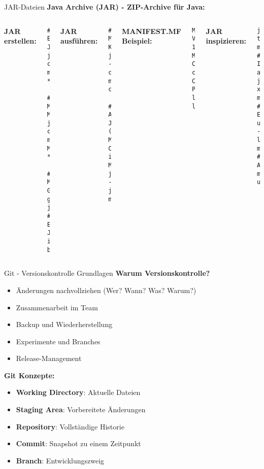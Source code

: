 \begin{frame}[fragile]{JAR-Dateien}
  \textbf{Java Archive (JAR) - ZIP-Archive für Java:}

  \begin{columns}[T]
    \textbf{JAR erstellen:}
    \begin{lstlisting}[style=java, basicstyle=\tiny\ttfamily, language={}]
# Einfache JAR
jar cf myapp.jar *.class

# Mit Manifest
jar cfm myapp.jar MANIFEST.MF *.class

# Mit Gradle
gradle jar  # Erstellt JAR in build/libs/
    \end{lstlisting}

    \textbf{JAR ausführen:}
    \begin{lstlisting}[style=java, basicstyle=\tiny\ttfamily, language={}]
# Mit Klassenname
java -cp myapp.jar com.example.Main

# Ausführbare JAR (mit Main-Class im Manifest)
java -jar myapp.jar
    \end{lstlisting}

    \textbf{MANIFEST.MF Beispiel:}
    \begin{lstlisting}[style=java, basicstyle=\tiny\ttfamily, language={}]
Manifest-Version: 1.0
Main-Class: com.example.Main
Class-Path: lib/dependency1.jar lib/dependency2.jar
    \end{lstlisting}

    \textbf{JAR inspizieren:}
    \begin{lstlisting}[style=java, basicstyle=\tiny\ttfamily, language={}]
jar tf myapp.jar        # Inhalt auflisten
jar xf myapp.jar        # Extrahieren
unzip -l myapp.jar      # Alternative mit unzip
    \end{lstlisting}
  \end{columns}
\end{frame}

\begin{frame}{Git - Versionskontrolle Grundlagen}
  \textbf{Warum Versionskontrolle?}
  \begin{itemize}
    \item Änderungen nachvollziehen (Wer? Wann? Was? Warum?)
    \item Zusammenarbeit im Team
    \item Backup und Wiederherstellung
    \item Experimente und Branches
    \item Release-Management
  \end{itemize}

  \textbf{Git Konzepte:}
  \begin{itemize}
    \item \textbf{Working Directory}: Aktuelle Dateien
    \item \textbf{Staging Area}: Vorbereitete Änderungen
    \item \textbf{Repository}: Vollständige Historie
    \item \textbf{Commit}: Snapshot zu einem Zeitpunkt
    \item \textbf{Branch}: Entwicklungszweig
  \end{itemize}
\end{frame}

